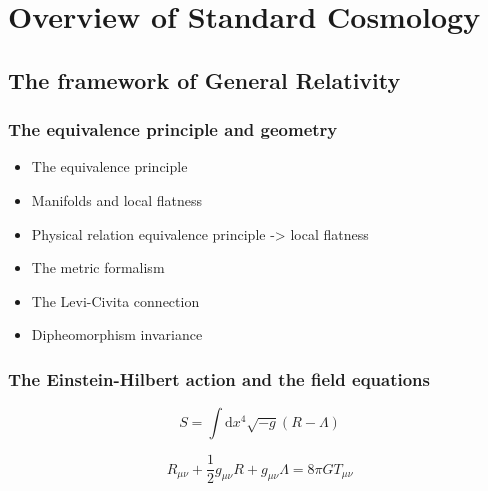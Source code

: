 
\chapter{Overview of Standard Cosmology} %

\label{Overview} %


\newcommand{\keyword}[1]{\textbf{#1}}
\newcommand{\tabhead}[1]{\textbf{#1}}
\newcommand{\code}[1]{\texttt{#1}}
\newcommand{\file}[1]{\texttt{\bfseries#1}}
\newcommand{\option}[1]{\texttt{\itshape#1}}


\section{The framework of General Relativity}

\subsection{The equivalence principle and geometry}
\begin{itemize}
\item The equivalence principle
\item Manifolds and local flatness
\item Physical relation equivalence principle -> local flatness
\item The metric formalism
\item The Levi-Civita connection
\item Dipheomorphism invariance
\end{itemize}


\subsection{The Einstein-Hilbert action and the field equations}

\begin{equation}
S = \int \textrm{d}x^4 \sqrt{-g}( R - \Lambda)
\end{equation}

\begin{equation}
R_{\mu \nu} + \frac{1}{2}g_{\mu \nu} R + g_{\mu \nu} \Lambda = 8 \pi G T_{\mu \nu}
\end{equation}


